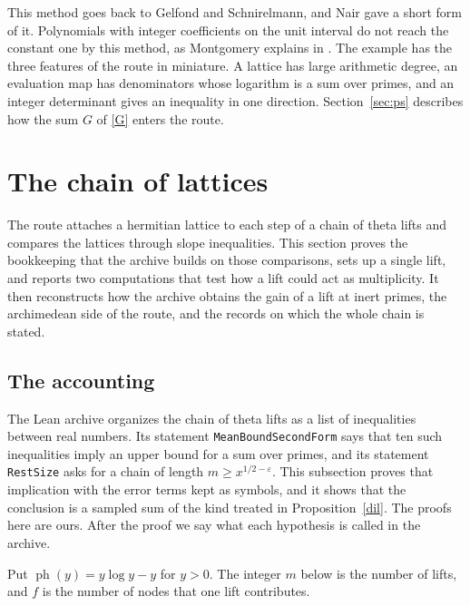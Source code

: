 \documentclass[11pt,letterpaper]{article}
\numberwithin{equation}{section}
\begin{document}
This method goes back to Gelfond and Schnirelmann, and Nair \cite{nair} gave a short form of it. Polynomials with integer coefficients on the unit interval do not reach the constant one by this method, as Montgomery explains in \cite[Ch.~10]{montgomery}. The example has the three features of the route in miniature. A lattice has large arithmetic degree, an evaluation map has denominators whose logarithm is a sum over primes, and an integer determinant gives an inequality in one direction. Section~\ref{sec:ps} describes how the sum $G$ of \eqref{G} enters the route.

\section{The chain of lattices}\label{sec:chain}

The route attaches a hermitian lattice to each step of a chain of theta lifts and compares the lattices through slope inequalities. This section proves the bookkeeping that the archive builds on those comparisons, sets up a single lift, and reports two computations that test how a lift could act as multiplicity. It then reconstructs how the archive obtains the gain of a lift at inert primes, the archimedean side of the route, and the records on which the whole chain is stated.

\subsection{The accounting}\label{sec:acct}

The Lean archive organizes the chain of theta lifts as a list of inequalities between real numbers. Its statement \texttt{MeanBoundSecondForm} says that ten such inequalities imply an upper bound for a sum over primes, and its statement \texttt{RestSize} asks for a chain of length $m\ge x^{1/2-\varepsilon}$. This subsection proves that implication with the error terms kept as symbols, and it shows that the conclusion is a sampled sum of the kind treated in Proposition~\ref{dil}. The proofs here are ours. After the proof we say what each hypothesis is called in the archive.

Put $\operatorname{ph}(y)=y\log y-y$ for $y>0$. The integer $m$ below is the number of lifts, and $f$ is the number of nodes that one lift contributes.
\end{document}
